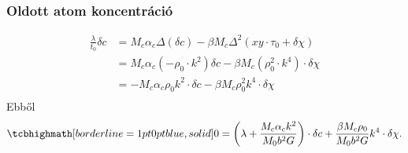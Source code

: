 \documentclass[10pt,a4paper]{scrartcl}
\begin{document}
\subsubsection{Oldott atom koncentráció}
\[\begin{aligned}
  \frac{\lambda }{{{t_0}}}\delta c &  =  {M_c}{\alpha _c}\Delta \left( {\delta c} \right) - \beta {M_c}{\Delta ^2}\left( {xy \cdot {\tau _0} + \delta \chi } \right) \\ 
   &  =  {M_c}{\alpha _c}\left( { - {\rho _0} \cdot {k^2}} \right)\delta c - \beta {M_c}\left( {\rho _0^2 \cdot {k^4}} \right) \cdot \delta \chi  \\ 
   &  = - {M_c}{\alpha _c}{\rho _0}{k^2} \cdot \delta c - \beta {M_c}\rho _0^2{k^4} \cdot \delta \chi  \\ 
\end{aligned} \]
Ebből
\begin{equation} \label{eq:lin_ed_c}
\tcbhighmath[borderline={1pt}{0pt}{blue,solid}]{
0 = \left( {\lambda  + \frac{{{M_c}{\alpha _c}{k^2}}}{{{M_0}{b^2}G}}} \right) \cdot \delta c + \frac{{\beta {M_c}{\rho _0}}}{{M_0 {b^2}G}}{k^4} \cdot \delta \chi.}
\end{equation}
\end{document}

